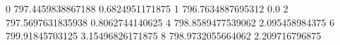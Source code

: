 0 797.4459838867188 0.6824951171875
1 796.7634887695312 0.0
2 797.5697631835938 0.8062744140625
4 798.8589477539062 2.095458984375
6 799.91845703125 3.15496826171875
8 798.9732055664062 2.209716796875
